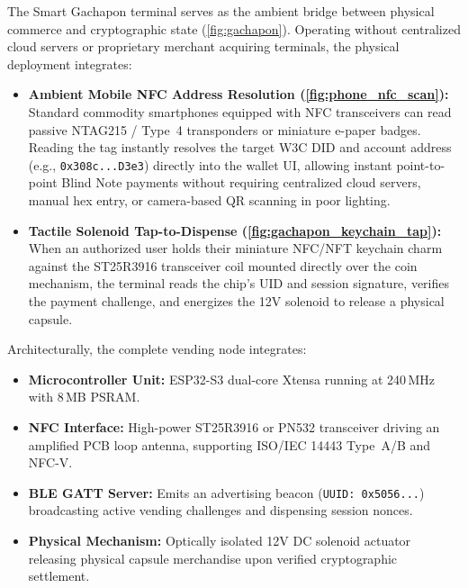 \documentclass[a4paper,11pt,twoside,parskip=half-,headings=small]{scrartcl}
\newcommand{\code}[1]{\texttt{#1}}
\begin{document}
The Smart Gachapon terminal serves as the ambient bridge between physical commerce
and cryptographic state (\cref{fig:gachapon}). Operating without centralized cloud servers or proprietary
merchant acquiring terminals, the physical deployment integrates:
\begin{itemize}
  \item \textbf{Ambient Mobile NFC Address Resolution (\cref{fig:phone_nfc_scan}):} Standard commodity smartphones equipped with NFC transceivers can read passive NTAG215 / Type~4 transponders or miniature e-paper badges. Reading the tag instantly resolves the target W3C DID and account address (e.g., \code{0x308c...D3e3}) directly into the wallet UI, allowing instant point-to-point Blind Note payments without requiring centralized cloud servers, manual hex entry, or camera-based QR scanning in poor lighting.
  \item \textbf{Tactile Solenoid Tap-to-Dispense (\cref{fig:gachapon_keychain_tap}):} When an authorized user holds their miniature NFC/NFT keychain charm against the ST25R3916 transceiver coil mounted directly over the coin mechanism, the terminal reads the chip's UID and session signature, verifies the payment challenge, and energizes the 12V solenoid to release a physical capsule.
\end{itemize}
Architecturally, the complete vending node integrates:
\begin{itemize}
  \item \textbf{Microcontroller Unit:} ESP32-S3 dual-core Xtensa running at 240\,MHz with 8\,MB PSRAM.
  \item \textbf{NFC Interface:} High-power ST25R3916 or PN532 transceiver driving an amplified
PCB loop antenna, supporting ISO/IEC 14443 Type~A/B and NFC-V.
  \item \textbf{BLE GATT Server:} Emits an advertising beacon (\code{UUID: 0x5056...}) broadcasting
active vending challenges and dispensing session nonces.
  \item \textbf{Physical Mechanism:} Optically isolated 12V DC solenoid actuator releasing
physical capsule merchandise upon verified cryptographic settlement.
\end{itemize}
\end{document}

